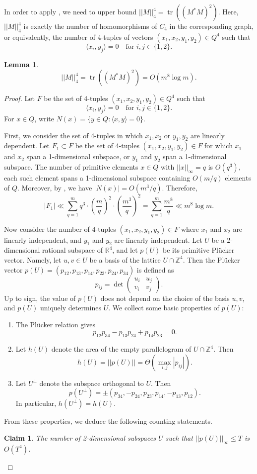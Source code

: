 \documentclass[11pt]{article}
\theoremstyle{plain}
\newtheorem{claim}[theorem]{Claim}
\newtheorem{lemma}[theorem]{Lemma}
\theoremstyle{definition}
\DeclareMathOperator{\tr}{tr}
\begin{document}
	In order to apply , we need to upper bound $||M||_4^4=\tr((M^*M)^2)$. Here, $||M||_4^4$ is exactly the number of homomorphisms of $C_4$ in the corresponding graph, or equivalently, the number of 4-tuples of vectors $(x_1,x_2,y_1,y_2)\in Q^4$ such that $$\langle x_i,y_j\rangle=0\quad \text{for }i,j\in \{1,2\}.$$
	
	
	\begin{lemma}\label{lemma:4cyclecount}
		$$||M||_4^4=\tr((M^*M)^2)=O(m^8 \log m).$$
	\end{lemma}
	
	\begin{proof}
		Let $F$ be the set of 4-tuples $(x_1,x_2,y_1,y_2)\in Q^4$ such that $$\langle x_i,y_j\rangle=0\quad \text{for }i,j\in \{1,2\}.$$
		For $x\in Q$, write $N(x)=\{y\in Q:\langle x,y\rangle=0\}$. 
		
		First, we consider the set of 4-tuples in which $x_1,x_2$ or $y_1,y_2$ are linearly dependent. Let $F_1\subset F$ be the set of 4-tuples $(x_1,x_2,y_1,y_2)\in F$ for which $x_1$ and $x_2$ span a 1-dimensional subspace, or $y_1$ and $y_2$ span a 1-dimensional subspace. The number of primitive elements $x\in Q$ with $||x||_{\infty}=q$ is $O(q^3)$, each such element spans a 1-dimensional subspace containing $O(m/q)$ elements of $Q$. Moreover, by , we have $|N(x)|=O(m^3/q)$. Therefore,
		$$|F_1|\ll \sum_{q=1}^{m} q^3\cdot \left(\frac{m}{q}\right)^2\cdot \left(\frac{m^{3}}{q}\right)^2= \sum_{q=1}^m \frac{m^{8}}{q}\ll m^8 \log m.$$
		
		Now consider the number of 4-tuples $(x_1,x_2,y_1,y_2)\in F$ where $x_1$ and $x_2$ are linearly independent, and $y_1$ and $y_2$ are linearly independent. Let $U$ be a 2-dimensional rational subspace of $\mathbb{R}^4$, and let $p(U)$ be its primitive Pl\"ucker vector. Namely, let $u,v\in U$ be a basis of the lattice $U\cap \mathbb{Z}^4 $. Then the Pl\"ucker vector $p(U)=(p_{12},p_{13},p_{14},p_{23},p_{24},p_{34})$ is defined as
		$$p_{ij}=\det\begin{pmatrix} u_i & u_j \\ v_i & v_j \end{pmatrix}.$$
		Up to sign, the value of $p(U)$ does not depend on the choice of the basis $u,v$, and $p(U)$ uniquely determines $U$. We collect some basic properties of $p(U)$:
		\begin{enumerate}
			\item The Pl\"ucker relation gives
			$$p_{12}p_{34}-p_{13}p_{24}+p_{14}p_{23}=0.$$
			\item Let $h(U)$ denote the area of the empty parallelogram of $U\cap \mathbb{Z}^4$. Then 
			$$h(U)=||p(U)||=\Theta(\max_{i,j}|p_{ij}|).$$
			\item Let $U^{\perp}$ denote the subspace orthogonal to $U$. Then
			$$p(U^{\perp})=\pm(p_{34},-p_{24},p_{23},p_{14},-p_{13},p_{12}).$$
			In particular, $h(U^{\perp})=h(U)$.
		\end{enumerate}
		From these properties, we deduce the following counting statements.
		\begin{claim}
			The number of 2-dimensional subspaces $U$ such that $||p(U)||_{\infty}\leq T$ is   $O(T^4)$. 
		\end{claim}
		

\end{proof}
\end{document}
